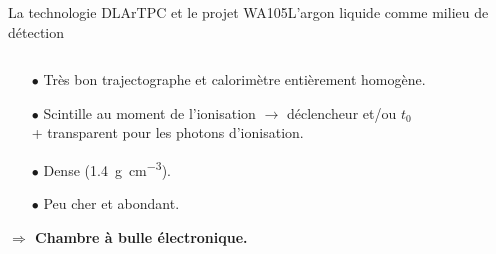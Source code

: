 \begin{frame}{La technologie DLArTPC et le projet WA105}{L'argon liquide comme milieu de détection}
\begin{scriptsize}
\begin{columns}
\begin{column}{0.4\textwidth}
\begin{itemize}
    				\item[$\bullet$] Très bon trajectographe et calorimètre entièrement homogène.
    				\item[$\bullet$] Scintille au moment de l'ionisation $\rightarrow$ déclencheur et/ou $t_0$ \\ + transparent pour les photons  d'ionisation.
    				\item[$\bullet$] Dense (\SI{1.4}{\gram\per\centi\meter^3}).
    				\item[$\bullet$] Peu cher et abondant.
    			\end{itemize}
    			\begin{footnotesize}
	    			\textbf{$\Rightarrow$ Chambre à bulle électronique.}
	    		\end{footnotesize}
    		\end{column}
    	\end{columns}
	  \end{scriptsize}
    \end{frame}

  {
    	\setlength\pdfpagewidth{12.8cm}%
    	\setlength\pdfpageheight{9.15cm}%
    	\begin{frame}[plain]
    	\end{frame}
    }

